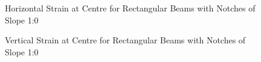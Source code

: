 \documentclass[11pt,a4paper]{article}
\numberwithin{equation}{subsection}
\begin{document}
\begin{figure}[h]
	\begin{center}
	\end{center}
	\caption{Horizontal Strain at Centre for Rectangular Beams with Notches of Slope 1:0}
	\label{fig:Rect_10_Z}
\end{figure}

\begin{figure}[h]
	\begin{center}
	\end{center}
	\caption{Vertical Strain at Centre for Rectangular Beams with Notches of Slope 1:0}
	\label{fig:Rect_10_Y}
\end{figure}
\pagebreak

\vspace*{\baselineskip}
\end{document}
